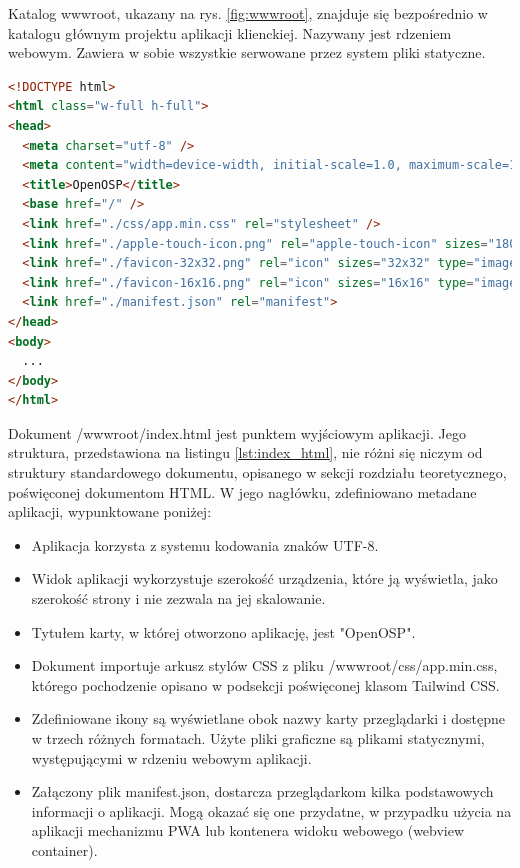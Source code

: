Katalog wwwroot, ukazany na rys. \ref{fig:wwwroot}, znajduje się bezpośrednio w  katalogu głównym projektu aplikacji klienckiej. Nazywany jest rdzeniem webowym. Zawiera w sobie wszystkie serwowane przez system pliki statyczne.

\begin{lstlisting}[language=HTML, caption={Struktura dokumentu index.html w rdzeniu webowym aplikacji klienckiej}, label=lst:index_html]
<!DOCTYPE html>
<html class="w-full h-full">
<head>
  <meta charset="utf-8" />
  <meta content="width=device-width, initial-scale=1.0, maximum-scale=1.0, user-scalable=no" name="viewport" />
  <title>OpenOSP</title>
  <base href="/" />
  <link href="./css/app.min.css" rel="stylesheet" />
  <link href="./apple-touch-icon.png" rel="apple-touch-icon" sizes="180x180">
  <link href="./favicon-32x32.png" rel="icon" sizes="32x32" type="image/png">
  <link href="./favicon-16x16.png" rel="icon" sizes="16x16" type="image/png">
  <link href="./manifest.json" rel="manifest">
</head>
<body>
  ...
</body>
</html>
\end{lstlisting}

Dokument /wwwroot/index.html jest punktem wyjściowym aplikacji. Jego struktura, przedstawiona na listingu \ref{lst:index_html}, nie różni się niczym od struktury standardowego dokumentu, opisanego w sekcji rozdziału teoretycznego, poświęconej dokumentom HTML. W jego nagłówku, zdefiniowano metadane aplikacji, wypunktowane poniżej:

\begin{itemize}
    \item Aplikacja korzysta z systemu kodowania znaków UTF-8.
    \item Widok aplikacji wykorzystuje szerokość urządzenia, które ją wyświetla, jako szerokość strony i nie zezwala na jej skalowanie.
    \item Tytułem karty, w której otworzono aplikację, jest "OpenOSP".
    \item Dokument importuje arkusz stylów CSS z pliku /wwwroot/css/app.min.css, którego pochodzenie opisano w podsekcji poświęconej klasom Tailwind CSS.
    \item Zdefiniowane ikony są wyświetlane obok nazwy karty przeglądarki i dostępne w trzech różnych formatach. Użyte pliki graficzne są plikami statycznymi, występującymi w rdzeniu webowym aplikacji.
    \item Załączony plik manifest.json, dostarcza przeglądarkom kilka podstawowych informacji o aplikacji. Mogą okazać się one przydatne, w przypadku użycia na aplikacji mechanizmu PWA lub kontenera widoku webowego (webview container).
\end{itemize}

